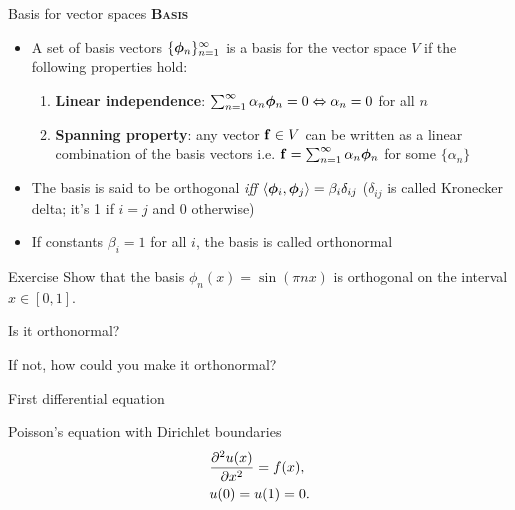 
\begin{frame}{Basis for vector spaces}	
	\textbf{\textsc{Basis}}
	\begin{itemize}
		\item A set of \alert{basis vectors} $ \{\ffor_n \}_{n=1}^\infty $ is a basis for the vector space $ V $ if the following properties hold:
		\begin{enumerate}
			\item \textbf{Linear independence}: $ \sum_{n=1}^{\infty} \alpha_n \ffor_{n} = 0 \Leftrightarrow \alpha_n = 0 $ for all $ n $
			\item \textbf{Spanning property}: any vector $ \fone \in V $ can be written as a linear combination of the basis vectors i.e. $ \fone = \sum_{n=1}^\infty \alpha_n \ffor_n $ for some $ \{ \alpha_n \} $ 
		\end{enumerate}
		\item The basis is said to be \alert{orthogonal} \textit{iff} $ \iprod{\ffor_i}{\ffor_j} = \beta_{i}
		\delta_{ij} $ ($ \delta_{ij} $ is called Kronecker delta; it's 1 if $ i = j $ and 0 otherwise) 
		\item If constants $ \beta_{i} = 1 $ for all $ i$, the basis is called \alert{orthonormal}
	\end{itemize}
\end{frame}



\begin{frame}{Exercise}
	Show that the basis $ \phi_n (x) = \sin(\pi n x) $ is orthogonal on the interval $x \in [0,1] $. 
	
	Is it orthonormal? 
	
	If not, how could you make it orthonormal?
\end{frame}


\begin{frame}{First differential equation}
	\begin{block}{\centering Poisson's equation with Dirichlet boundaries}
		\begin{align*}
			&\pfrac[2]{u(x)}{x} = f(x), \\
			&u(0) = u(1) = 0.
		\end{align*}
	\end{block}
\end{frame}

